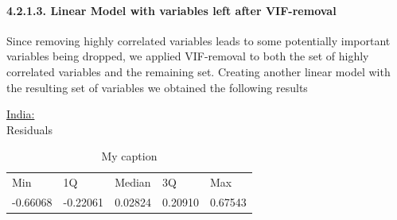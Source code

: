 \documentclass[12pt,a4paper,english]{article}
\begin{document}
\paragraph{4.2.1.3. Linear Model with variables left after VIF-removal}

Since removing highly correlated variables leads to some potentially important variables being dropped, we applied VIF-removal to both the set of highly correlated variables and the remaining set.
Creating another linear model with the resulting set of variables we obtained the following results

\underline{India:} \\
Residuals
\FloatBarrier
\begin{table}[!htbp]
\centering
\begin{tabular}{lllll}
Min      & 1Q       & Median  & 3Q      & Max     \\
-0.66068 & -0.22061 & 0.02824 & 0.20910 & 0.67543
\end{tabular}
\caption{My caption}
\label{my-label}
\end{table}
\FloatBarrier
\end{document}
